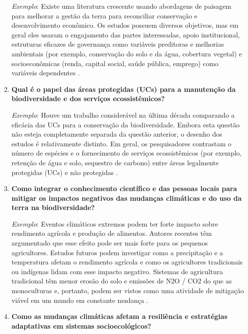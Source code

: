\documentclass[
]{book}
\begin{document}
\begin{enumerate}
  \emph{Exemplo}: Existe uma literatura crescente usando abordagens de paisagem para melhorar a gestão da terra para reconciliar conservação e desenvolvimento econômico. Os estudos possuem diversos objetivos, mas em geral eles usaram o engajamento das partes interessadas, apoio institucional, estruturas eficazes de governança como variáveis preditoras e melhorias ambientais (por exemplo, conservação do solo e da água, cobertura vegetal) e socioeconômicas (renda, capital social, saúde pública, emprego) como variáveis dependentes \citep{reed_have_2017}.
\item
  \textbf{Qual é o papel das áreas protegidas (UCs) para a manutenção da biodiversidade e dos serviços ecossistêmicos?}

  \emph{Exemplo}: Houve um trabalho considerável na última década comparando a eficácia das UCs para a conservação da biodiversidade. Embora esta questão não esteja completamente separada da questão anterior, o desenho dos estudos é relativamente distinto. Em geral, os pesquisadores contrastam o número de espécies e o fornecimento de serviços ecossistêmicos (por exemplo, retenção de água e solo, sequestro de carbono) entre áreas legalmente protegidas (UCs) e não protegidas \citep{xu_strengthening_2017}.
\item
  \textbf{Como integrar o conhecimento científico e das pessoas locais para mitigar os impactos negativos das mudanças climáticas e do uso da terra na biodiversidade?}

  \emph{Exemplo}: Eventos climáticos extremos podem ter forte impacto sobre rendimento agrícola e produção de alimentos. Autores recentes têm argumentado que esse efeito pode ser mais forte para os pequenos agricultores. Estudos futuros podem investigar como a precipitação e a temperatura afetam o rendimento agrícola e como os agricultores tradicionais ou indígenas lidam com esse impacto negativo. Sistemas de agricultura tradicional têm menor erosão do solo e emissões de N2O / CO2 do que as monoculturas e, portanto, podem ser vistos como uma atividade de mitigação viável em um mundo em constante mudança \citep{niggli_low_2009, altieri_adaptation_2017}.
\item
  \textbf{Como as mudanças climáticas afetam a resiliência e estratégias adaptativas em sistemas socioecológicos?}


\end{enumerate}
\end{document}
